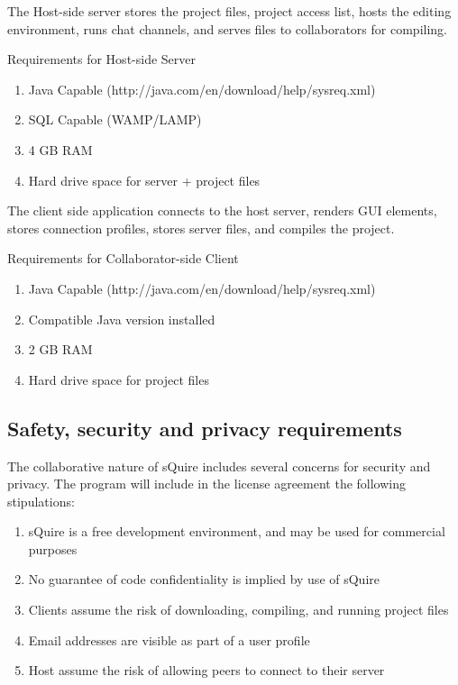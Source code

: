 \documentclass[twoside,letterpaper]{article}
\begin{document}
		The Host-side server stores the project files, project access list, hosts the editing environment, runs chat channels, and serves files to collaborators for compiling.
		
		Requirements for Host-side Server
		\begin{enumerate}
		  \item Java Capable (http://java.com/en/download/help/sysreq.xml)
		  \item SQL Capable (WAMP/LAMP)
		  \item 4 GB RAM
		  \item Hard drive space for server + project files
		\end{enumerate}
		
		The client side application connects to the host server, renders GUI elements, stores connection profiles, stores server files, and compiles the project.
		
		Requirements for Collaborator-side Client
		\begin{enumerate}
		  \item Java Capable (http://java.com/en/download/help/sysreq.xml)
		  \item Compatible Java version installed
		  \item 2 GB RAM
		  \item Hard drive space for project files
		\end{enumerate}
		
	\subsection[Safety, security and privacy requirements]{\rmfamily\bfseries
		Safety, security and privacy requirements}
		\hypertarget{RefHeading18659017292}{}
		
		The collaborative nature of sQuire includes several concerns for security and privacy. The program will include in the license agreement the following stipulations:
		\begin{enumerate}
		  \item sQuire is a free development environment, and may be used for commercial purposes
		  \item No guarantee of code confidentiality is implied by use of sQuire
		  \item Clients assume the risk of downloading, compiling, and running project files
		  \item Email addresses are visible as part of a user profile
		  \item Host assume the risk of allowing peers to connect to their server
		\end{enumerate}
		
\end{document}
